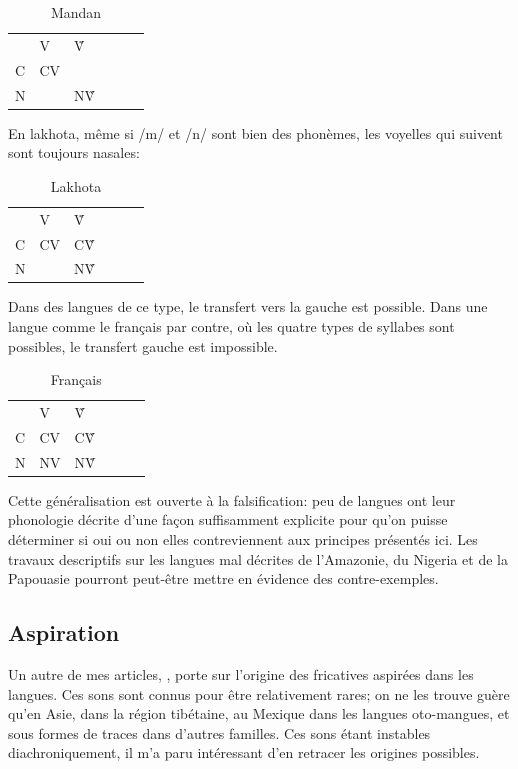 \documentclass[oldfontcommands,oneside,a4paper,11pt]{memoir}
\begin{document}
\begin{table}[h]
\caption{Mandan}
\centering
\begin{tabular}{llllll}  \toprule
& V & Ṽ \\
C &  CV &\\
N & & NṼ\\
\bottomrule
\end{tabular}
\end{table}
En lakhota, même si /m/ et /n/ sont bien des phonèmes, les voyelles qui suivent sont toujours nasales:

\begin{table}[h]
\caption{Lakhota}
\centering
\begin{tabular}{llllll}  \toprule \
& V & Ṽ \\
C &  CV &CṼ\\
N & & NṼ\\
\bottomrule
\end{tabular}
\end{table}

Dans des langues de ce type, le transfert vers la gauche est possible. Dans une langue comme le français par contre, où les quatre types de syllabes sont possibles, le transfert gauche est impossible.
\begin{table}[h]
\caption{Français}
\centering
\begin{tabular}{llllll}  \toprule \
& V & Ṽ \\
C &  CV &CṼ\\
N & NV& NṼ\\
\bottomrule
\end{tabular}
\end{table}



Cette généralisation est   ouverte à la falsification: peu de langues ont leur phonologie décrite d'une façon suffisamment explicite pour qu'on puisse déterminer si oui ou non elles contreviennent aux principes présentés ici. Les travaux descriptifs sur les langues mal décrites de l'Amazonie, du Nigeria et de la Papouasie pourront peut-être mettre en évidence des contre-exemples.

\subsection{Aspiration}
Un autre de mes articles, \citet{jacques11lingua}, porte sur l'origine des fricatives aspirées dans les langues. Ces sons sont connus pour être relativement rares; on ne les trouve guère qu'en Asie, dans la région tibétaine, au Mexique dans les langues oto-mangues, et sous formes de traces dans d'autres familles. Ces sons étant instables diachroniquement, il m'a paru intéressant d'en retracer les origines possibles. 
\end{document}
